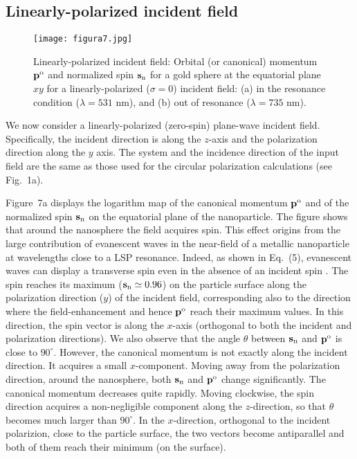 \documentclass[journal=apchd5,manuscript=article]{achemso}
\begin{document}
\subsection*{Linearly-polarized incident field}
\begin{figure}[!ht]
	\centering
	\texttt{[image: figura7.jpg]}
	\caption{Linearly-polarized incident field: Orbital (or canonical) momentum ${\bf p}^{\rm o}$ and normalized spin ${\bf s}_{\rm n}$ for a gold sphere at the equatorial plane $xy$ for a linearly-polarized ($\sigma=0$) incident field: (a) in the resonance condition ($\lambda=531$ nm), and (b) out of resonance  ($\lambda=735$ nm). 
		\label{fig:7}}
\end{figure}
We now consider a linearly-polarized (zero-spin) plane-wave incident field. Specifically, the incident direction is along the $z$-axis and the polarization direction along the $y$ axis. The system and the incidence direction of the input field are the same as those used for the circular polarization calculations (see Fig.\ 1a). 

Figure~7a displays the logarithm map of the canonical momentum ${\bf p}^{\rm o}$ and of the normalized spin ${\bf s}_{\rm n}$ on the equatorial plane of the nanoparticle. 
The figure shows that around the nanosphere the field acquires spin. This effect origins from the large contribution of evanescent waves in the near-field of a metallic nanoparticle at wavelengths close to a LSP resonance. Indeed, as shown in Eq.~(5), evanescent waves can display a transverse spin even in the absence of an incident spin \cite{Bliokh2014}.
The spin reaches its maximum (${\bf s}_{\rm n} \simeq 0.96$) on the particle surface along the polarization direction ($y$) of the incident field, corresponding also to the direction where the field-enhancement and hence ${\bf p}^{\rm o}$ reach their maximum values. In this direction, the spin vector is along the $x$-axis (orthogonal to both the incident and polarization directions).  We also observe that the angle $\theta$ between  ${\bf s}_{\rm n}$ and ${\bf p}^{\rm o}$ is close to $90^\circ$. However, the canonical momentum  is not exactly along the incident direction. It acquires a small $x$-component. Moving away from the polarization direction, around the nanosphere, both ${\bf s}_{\rm n}$ and ${\bf p}^{\rm o}$
change significantly. The canonical momentum decreases quite rapidly.
Moving clockwise, the spin direction acquires a non-negligible component along the $z$-direction, so that $\theta$ becomes much larger than $90^\circ$. In the $x$-direction, orthogonal to the incident polarizion,
close to the particle surface, the two vectors become antiparallel and both of them reach their minimum (on the surface).
\end{document}
